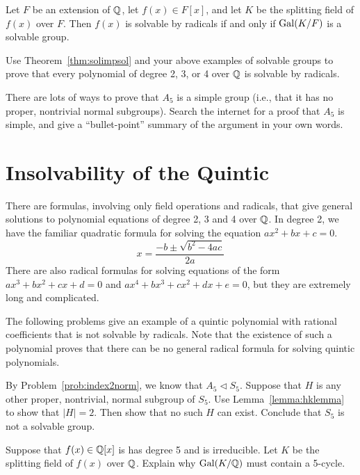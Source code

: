 \begin{theorem}[Galois]
    Let $F$ be an extension of $\mathbb{Q}$, let $f(x)\in F[x]$, and let $K$ be the splitting field of $f(x)$ over $F$. Then $f(x)$ is solvable by radicals if and only if $\operatorname{Gal}(K/F)$ is a solvable group.
    \label{thm:solimpsol}
\end{theorem}

\begin{problem}
    Use Theorem~\ref{thm:solimpsol} and your above examples of solvable groups to prove that every polynomial of degree 2, 3, or 4 over $\mathbb{Q}$ is solvable by radicals.
\end{problem}



\begin{problem}
    There are lots of ways to prove that $A_5$ is a simple group (i.e., that it has no proper, nontrivial normal subgroups). Search the internet for a proof that $A_5$ is simple, and give a ``bullet-point'' summary of the argument in your own words.
\end{problem}


\section{Insolvability of the Quintic}

There are formulas, involving only field operations and radicals, that give general solutions to polynomial equations of degree 2, 3 and 4 over $\mathbb{Q}$. In degree 2, we have the familiar quadratic formula for solving the equation $ax^2+bx+c=0$.
$$x=\frac{-b\pm\sqrt{b^2-4ac}}{2a}$$
There are also radical formulas for solving equations of the form $ax^3+bx^2+cx+d=0$ and  $ax^4+bx^3+cx^2+dx+e=0$, but they are extremely long and complicated.
\medskip

The following problems give an example of a quintic polynomial with rational coefficients that is not solvable by radicals. Note that the existence of such a polynomial proves that there can be no general radical formula for solving quintic polynomials.

\begin{problem}
    By Problem~\ref{prob:index2norm}, we know that $A_5 \lhd S_5$. Suppose that $H$ is any other proper, nontrivial, normal subgroup of $S_5$. Use Lemma~\ref{lemma:hklemma} to show that $|H|=2$. Then show that no such $H$ can exist. Conclude that $S_5$ is not a solvable group.
\end{problem}

\begin{problem}
    Suppose that $f(x) \in \mathbb{Q}[x]$ is has degree 5 and is irreducible.
    Let $K$ be the splitting field of $f(x)$ over $\mathbb{Q}$. Explain why $\operatorname{Gal}(K/\mathbb{Q})$ must contain a 5-cycle.
\end{problem}

